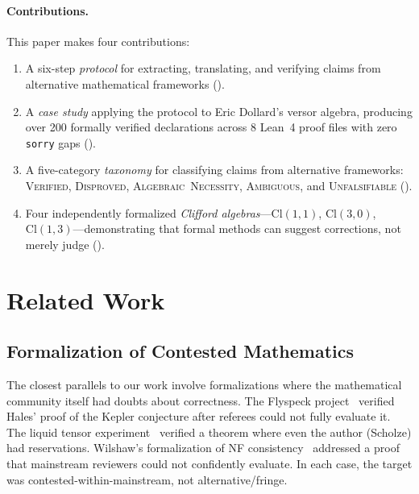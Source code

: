 \documentclass[runningheads]{llncs}
\begin{document}
\paragraph{Contributions.} This paper makes four contributions:
\begin{enumerate}
\item A six-step \emph{protocol} for extracting, translating, and verifying
  claims from alternative mathematical frameworks ().
\item A \emph{case study} applying the protocol to Eric Dollard's versor
  algebra, producing over 200 formally verified declarations across 8 Lean~4 proof
  files with zero \texttt{sorry} gaps ().
\item A five-category \emph{taxonomy} for classifying claims from alternative
  frameworks: \textsc{Verified}, \textsc{Disproved},
  \textsc{Algebraic~Necessity}, \textsc{Ambiguous}, and \textsc{Unfalsifiable}
  ().
\item Four independently formalized \emph{Clifford algebras}---$\mathrm{Cl}(1,1)$,
  $\mathrm{Cl}(3,0)$, $\mathrm{Cl}(1,3)$---demonstrating that formal methods
  can suggest corrections, not merely judge ().
\end{enumerate}

\section{Related Work}
\label{sec:related}

\subsection{Formalization of Contested Mathematics}

The closest parallels to our work involve formalizations where the mathematical
community itself had doubts about correctness. The Flyspeck
project~\cite{hales2017formal} verified Hales' proof of the Kepler conjecture
after referees could not fully evaluate it. The liquid tensor
experiment~\cite{commelin2022liquid} verified a theorem where even the author
(Scholze) had reservations. Wilshaw's formalization of NF
consistency~\cite{wilshaw2024nf} addressed a proof that mainstream reviewers
could not confidently evaluate. In each case, the target was
contested-within-mainstream, not alternative/fringe.
\end{document}
